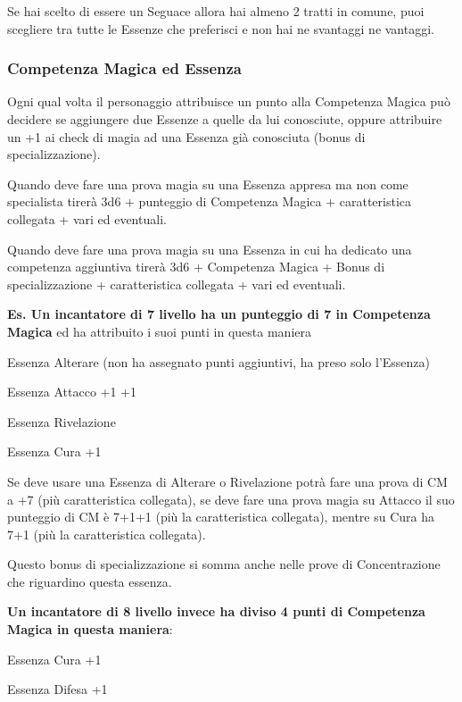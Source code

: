 \documentclass[a4paper,10 pt,twoside,openany]{book}
\begin{document}
Se hai scelto di essere un Seguace allora hai almeno 2 tratti in comune, puoi scegliere tra tutte le Essenze che preferisci e non hai ne svantaggi ne vantaggi.

\subsubsection{Competenza Magica ed Essenza}

\label{competenza-magica-ed-essenza}

Ogni qual volta il personaggio attribuisce un punto alla Competenza Magica può decidere se aggiungere due Essenze a quelle da lui conosciute, oppure attribuire un +1 ai check di magia ad una Essenza già conosciuta (bonus di specializzazione).

Quando deve fare una prova magia su una Essenza appresa ma non come specialista tirerà 3d6 + punteggio di Competenza Magica + caratteristica collegata + vari ed eventuali.

Quando deve fare una prova magia su una Essenza in cui ha dedicato una competenza aggiuntiva tirerà 3d6 + Competenza Magica + Bonus di specializzazione + caratteristica collegata + vari ed eventuali.

\bigskip

\textbf{Es. Un incantatore di 7 livello ha un punteggio di 7 in Competenza Magica} ed ha attribuito i suoi punti in questa maniera

Essenza Alterare (non ha assegnato punti aggiuntivi, ha preso solo l'Essenza)

Essenza Attacco +1 +1

Essenza Rivelazione

Essenza Cura +1

Se deve usare una Essenza di Alterare o Rivelazione potrà fare una prova di CM a +7 (più caratteristica collegata), se deve fare una prova magia su Attacco il suo punteggio di CM è 7+1+1 (più la caratteristica collegata), mentre su Cura ha 7+1 (più la caratteristica collegata).

Questo bonus di specializzazione si somma anche nelle prove di Concentrazione che riguardino questa essenza.

\bigskip

\textbf{Un incantatore di 8 livello invece ha diviso 4 punti di Competenza Magica in questa maniera}:

Essenza Cura +1

Essenza Difesa +1
\end{document}

